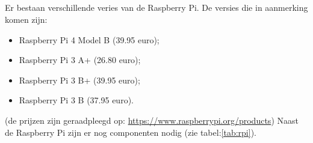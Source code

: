 \subsection{}
Er bestaan verschillende veries van de Raspberry Pi. De versies die in aanmerking komen zijn:
\begin{itemize}
    \item Raspberry Pi 4 Model B (39.95 euro);
    \item Raspberry Pi 3 A+ (26.80 euro);
    \item Raspberry Pi 3 B+ (39.95 euro);
    \item Raspberry Pi 3 B (37.95 euro).
\end{itemize}
(de prijzen zijn geraadpleegd op: \url{https://www.raspberrypi.org/products})
\newline
Naast de Raspberry Pi zijn er nog componenten nodig (zie tabel:\ref{tab:rpi}).
